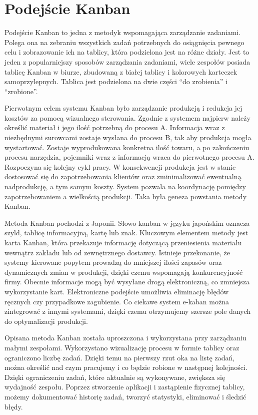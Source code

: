 \section{Podejście Kanban}

\indent 
Podejście Kanban to jedna z metodyk wspomagająca zarządzanie zadaniami. Polega ona na zebraniu wszystkich zadań potrzebnych do osiągnięcia pewnego celu i zobrazowanie ich na tablicy, która podzielona jest na różne działy. Jest to jeden z popularniejszy sposobów zarządzania zadaniami, wiele zespołów posiada tablicę Kanban w biurze, zbudowaną z białej tablicy i kolorowych karteczek samoprzylepnych. Tablica jest podzielona na dwie części “do zrobienia” i “zrobione”.

Pierwotnym celem systemu Kanban było zarządzanie produkcją i redukcja jej kosztów za pomocą wizualnego sterowania. Zgodnie z systemem najpierw należy określić materiał i jego ilość potrzebną do procesu A. Informacja wraz z niezbędnymi surowcami zostaje wysłana do procesu B, tak aby produkcja mogła wystartować. Zostaje wyprodukowana konkretna ilość towaru, a po zakończeniu procesu narzędzia, pojemniki wraz z informacją  wraca do pierwotnego procesu A. Rozpoczyna  się kolejny cykl pracy. W konsekwencji produkcja jest w stanie dostosować się do zapotrzebowania klientów oraz zminimalizować ewentualną nadprodukcję, a tym samym koszty. System pozwala na koordynację pomiędzy zapotrzebowaniem a wielkością produkcji. Taka była geneza powstania metody Kanban.

\indent Metoda Kanban pochodzi z Japonii. Słowo kanban w języku japońskim oznacza szyld, tablicę informacyjną, kartę lub znak.  Kluczowym elementem metody jest karta Kanban, która przekazuje informację dotyczącą przeniesienia materiału wewnątrz zakładu lub od zewnętrznego dostawcy. Istnieje przekonanie, że systemy kierowane popytem prowadzą do mniejszej ilości zapasów oraz dynamicznych zmian w produkcji, dzięki czemu wspomagają konkurencyjność firmy. Obecnie informacje mogą być wysyłane drogą elektroniczną, co zmniejsza wykorzystanie kart. Elektroniczne podejście umożliwia eliminację błędów ręcznych czy przypadkowe zagubienie. Co ciekawe system e-kaban można zintegrować z innymi systemami, dzięki czemu otrzymujemy szersze pole danych do optymalizacji produkcji.


Opisana metoda Kanban została uproszczona i wykorzystana przy zarządzaniu małymi zespołami. Wykorzystano wizualizację procesu w formie tablicy oraz ograniczono liczbę zadań. Dzięki temu na pierwszy rzut oka na listę zadań, można określić nad czym pracujemy i co będzie robione w następnej kolejności. Dzięki ograniczeniu zadań, które aktualnie są wykonywane, zwiększa się wydajność zespołu. Poprzez stworzenie aplikacji i zastąpienie fizycznej tablicy, możemy dokumentować historię zadań, tworzyć statystyki, eliminować i śledzić błędy.


